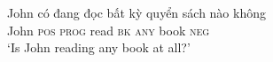 \documentclass[output=paper,colorlinks,citecolor=brown]{langscibook}
\begin{document}

\ea
\gll John có đang đọc {bất kỳ} {quyển sách nào} không\\
John \textsc{pos} \textsc{prog} read \textsc{bk} {\textsc{any} book} \textsc{neg}\\
\glt `Is John reading any book at all?'\label{bkex}
\z
\end{document}
